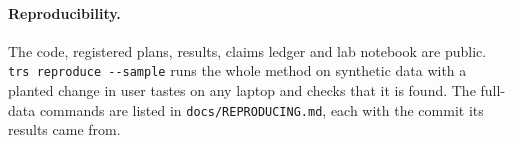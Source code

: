 \documentclass[11pt]{article}
\begin{document}
\paragraph{Reproducibility.} The code, registered plans, results, claims ledger and lab notebook
are public. \texttt{trs reproduce -{}-sample} runs the whole method on synthetic data with a
planted change in user tastes on any laptop and checks that it is found. The full-data commands
are listed in \texttt{docs/REPRODUCING.md}, each with the commit its results came from.



\end{document}
